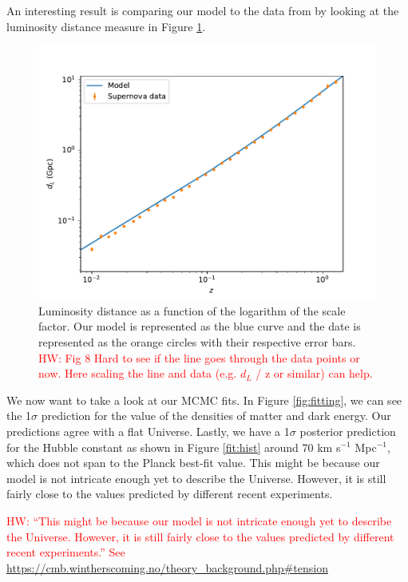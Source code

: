 \documentclass{aa}
\newcommand{\hw}[1]{\textcolor{red}{HW: #1}}
\begin{document}
An interesting result is comparing our model to the data from \cite{Betoule_2014} by looking at the luminosity distance measure in Figure \ref{fig:dL}.

\begin{figure}[ht]
\centering
\includegraphics[width=\hsize]{figures/dL.pdf}
  \caption{Luminosity distance as a function of the logarithm of the scale factor. Our model is represented as the blue curve and the date is represented as the orange circles with their respective error bars. \hw{Fig 8 Hard to see if the line goes through the data points or now. Here scaling the line and data (e.g. $d_L$ / z or similar) can help.}}
     \label{fig:dL}
\end{figure}

We now want to take a look at our MCMC fits. In Figure \ref{fig:fitting}, we can see the 1$\sigma$ prediction for the value of the densities of matter and dark energy. Our predictions agree with a flat Universe. Lastly, we have a 1$\sigma$ posterior prediction for the Hubble constant as shown in Figure \ref{fit:hist} around 70 km s$^{-1}$ Mpc$^{-1}$, which does not span to the Planck best-fit value. This might be because our model is not intricate enough yet to describe the Universe. However, it is still fairly close to the values predicted by different recent experiments.

\hw{“This might be because our model is not intricate enough yet to describe the Universe. However, it is still fairly close to the values predicted by different recent experiments.”  See \url{https://cmb.wintherscoming.no/theory_background.php#tension}}
\end{document}
